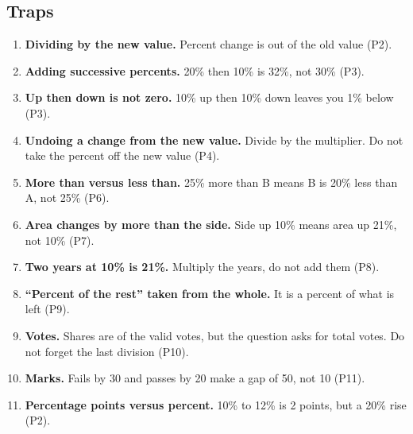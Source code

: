 \documentclass[11pt,a4paper]{article}
\let\oldsubsection\subsection
\renewcommand{\subsection}{\needspace{9\baselineskip}\oldsubsection}
\begin{document}
\subsection*{Traps}
\begin{enumerate}
\item \textbf{Dividing by the new value.} Percent change is out of the old value (P2).
\item \textbf{Adding successive percents.} 20\% then 10\% is 32\%, not 30\% (P3).
\item \textbf{Up then down is not zero.} 10\% up then 10\% down leaves you 1\% below (P3).
\item \textbf{Undoing a change from the new value.} Divide by the multiplier. Do not take the percent off the new value (P4).
\item \textbf{More than versus less than.} 25\% more than B means B is 20\% less than A, not 25\% (P6).
\item \textbf{Area changes by more than the side.} Side up 10\% means area up 21\%, not 10\% (P7).
\item \textbf{Two years at 10\% is 21\%.} Multiply the years, do not add them (P8).
\item \textbf{``Percent of the rest'' taken from the whole.} It is a percent of what is left (P9).
\item \textbf{Votes.} Shares are of the valid votes, but the question asks for total votes. Do not forget the last division (P10).
\item \textbf{Marks.} Fails by 30 and passes by 20 make a gap of 50, not 10 (P11).
\item \textbf{Percentage points versus percent.} 10\% to 12\% is 2 points, but a 20\% rise (P2).
\end{enumerate}
\end{document}

